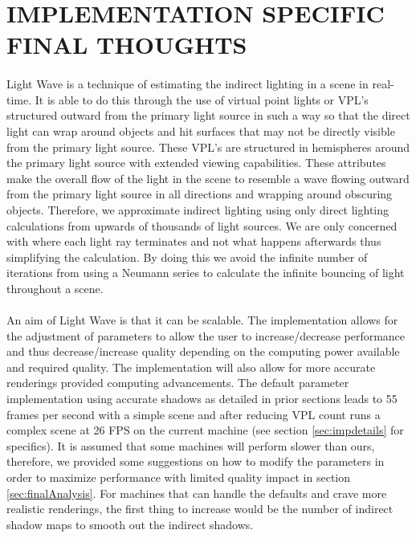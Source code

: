 \section{IMPLEMENTATION SPECIFIC FINAL THOUGHTS}
\paragraph{}
Light Wave is a technique of estimating the indirect lighting in a scene in real-time.  It is able to do this through the use of virtual point lights or VPL's structured outward from the primary light source in such a way so that the direct light can wrap around objects and hit surfaces that may not be directly visible from the primary light source.  These VPL's are structured in hemispheres around the primary light source with extended viewing capabilities.  These attributes make the overall flow of the light in the scene to resemble a wave flowing outward from the primary light source in all directions and wrapping around obscuring objects.  Therefore, we approximate indirect lighting using only direct lighting calculations from upwards of thousands of light sources.  We are only concerned with where each light ray terminates and not what happens afterwards thus simplifying the calculation.  By doing this we avoid the infinite number of iterations from using a Neumann series to calculate the infinite bouncing of light throughout a scene.

\paragraph{}
An aim of Light Wave is that it can be scalable.  The implementation allows for the adjustment of parameters to allow the user to increase/decrease performance and thus decrease/increase quality depending on the computing power available and required quality.  The implementation will also allow for more accurate renderings provided computing advancements.  The default parameter implementation using accurate shadows as detailed in prior sections leads to 55 frames per second with a simple scene and after reducing VPL count runs a complex scene at 26 FPS on the current machine (see section \ref{sec:impdetails} for specifics).  It is assumed that some machines will perform slower than ours, therefore, we provided some suggestions on how to modify the parameters in order to maximize performance with limited quality impact in section \ref{sec:finalAnalysis}.  For machines that can handle the defaults and crave more realistic renderings, the first thing to increase would be the number of indirect shadow maps to smooth out the indirect shadows.

